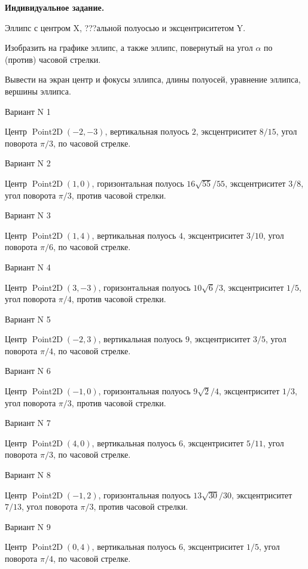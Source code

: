\documentclass[11pt]{report}
\begin{document}
\pagestyle{empty}

{\bf Индивидуальное задание.}


Эллипс с центром X, ???альной полуосью  и эксцентриситетом Y.


Изобразить на графике эллипс, а также эллипс, повернутый на угол $\alpha$ по (против) часовой стрелки. 


Вывести на экран центр и фокусы эллипса, длины полуосей, уравнение эллипса, вершины эллипса.

Вариант N 1

Центр $\operatorname{Point2D}\left(-2, -3\right)$, вертикальная полуось $2$, эксцентриситет $8 / 15$, угол поворота $\pi / 3$, по часовой стрелке.

Вариант N 2

Центр $\operatorname{Point2D}\left(1, 0\right)$, горизонтальная полуось $16 \sqrt{55} / 55$, эксцентриситет $3 / 8$, угол поворота $\pi / 3$, против часовой стрелки.

Вариант N 3

Центр $\operatorname{Point2D}\left(1, 4\right)$, вертикальная полуось $4$, эксцентриситет $3 / 10$, угол поворота $\pi / 6$, по часовой стрелке.

Вариант N 4

Центр $\operatorname{Point2D}\left(3, -3\right)$, горизонтальная полуось $10 \sqrt{6} / 3$, эксцентриситет $1 / 5$, угол поворота $\pi / 4$, против часовой стрелки.

Вариант N 5

Центр $\operatorname{Point2D}\left(-2, 3\right)$, вертикальная полуось $9$, эксцентриситет $3 / 5$, угол поворота $\pi / 4$, по часовой стрелке.

Вариант N 6

Центр $\operatorname{Point2D}\left(-1, 0\right)$, горизонтальная полуось $9 \sqrt{2} / 4$, эксцентриситет $1 / 3$, угол поворота $\pi / 3$, против часовой стрелки.

Вариант N 7

Центр $\operatorname{Point2D}\left(4, 0\right)$, вертикальная полуось $6$, эксцентриситет $5 / 11$, угол поворота $\pi / 3$, по часовой стрелке.

Вариант N 8

Центр $\operatorname{Point2D}\left(-1, 2\right)$, горизонтальная полуось $13 \sqrt{30} / 30$, эксцентриситет $7 / 13$, угол поворота $\pi / 3$, против часовой стрелки.

Вариант N 9

Центр $\operatorname{Point2D}\left(0, 4\right)$, вертикальная полуось $6$, эксцентриситет $1 / 5$, угол поворота $\pi / 4$, по часовой стрелке.
\end{document}
